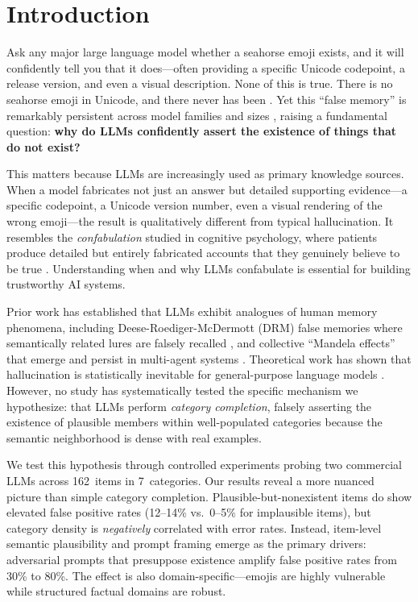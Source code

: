 \section{Introduction}
\label{sec:intro}

Ask any major large language model whether a seahorse emoji exists, and it will confidently tell you that it does---often providing a specific Unicode codepoint, a release version, and even a visual description.
None of this is true.
There is no seahorse emoji in Unicode, and there never has been \cite{unicode2024emoji}.
Yet this ``false memory'' is remarkably persistent across model families and sizes \cite{vogel2026seahorse}, raising a fundamental question: {\bf why do LLMs confidently assert the existence of things that do not exist?}

This matters because LLMs are increasingly used as primary knowledge sources.
When a model fabricates not just an answer but detailed supporting evidence---a specific codepoint, a Unicode version number, even a visual rendering of the wrong emoji---the result is qualitatively different from typical hallucination.
It resembles the \emph{confabulation} studied in cognitive psychology, where patients produce detailed but entirely fabricated accounts that they genuinely believe to be true \cite{schacter2001seven}.
Understanding when and why LLMs confabulate is essential for building trustworthy AI systems.

Prior work has established that LLMs exhibit analogues of human memory phenomena, including Deese-Roediger-McDermott (DRM) false memories where semantically related lures are falsely recalled \cite{cao2025memory}, and collective ``Mandela effects'' that emerge and persist in multi-agent systems \cite{xu2026mandela}.
Theoretical work has shown that hallucination is statistically inevitable for general-purpose language models \cite{kalai2025hallucinate, xu2024inevitable}.
However, no study has systematically tested the specific mechanism we hypothesize: that LLMs perform \emph{category completion}, falsely asserting the existence of plausible members within well-populated categories because the semantic neighborhood is dense with real examples.

We test this hypothesis through controlled experiments probing two commercial LLMs across 162~items in 7~categories.
Our results reveal a more nuanced picture than simple category completion.
Plausible-but-nonexistent items do show elevated false positive rates (12--14\% vs.\ 0--5\% for implausible items), but category density is \emph{negatively} correlated with error rates.
Instead, item-level semantic plausibility and prompt framing emerge as the primary drivers: adversarial prompts that presuppose existence amplify false positive rates from 30\% to 80\%.
The effect is also domain-specific---emojis are highly vulnerable while structured factual domains are robust.

